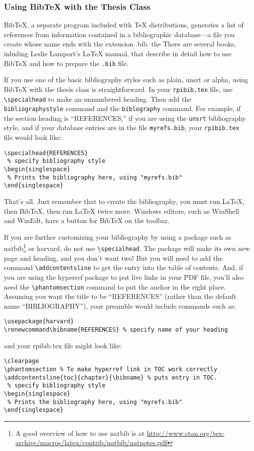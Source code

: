 \documentclass[letterpaper,11pt]{article}
\begin{document}
\subsubsection{Using Bib{\TeX} with the Thesis Class}

Bib{\TeX}, a separate program included with {\TeX} distributions, generates a list of references
from information contained in a bibliographic database—a file you create whose name ends
with the extension .bib. the There are several books, inluding Leslie Lamport's {\LaTeX} manual,
that describe in detail how to use Bib{\TeX} and how to prepare the
\verb|.bib| file.

If you use one of the basic bibliography styles such as plain, unsrt or alpha, using Bib{\TeX}
with the thesis class is straightforward. In your \verb|rpibib.tex| file, use \verb|\specialhead| to make
an unnumbered heading. Then add the \verb|bibliographystyle| command and the \verb|biblography|
command. For example, if the section heading is ``REFERENCES,'' if you are using the \verb|unsrt|
bibliography style, and if your database entries are in the file \verb|myrefs.bib|, your \verb|rpibib.tex|
file would look like:
\begin{verbatim}
\specialhead{REFERENCES}
 % specify bibliography style
\begin{singlespace}
 % Prints the bibliography here, using "myrefs.bib"
\end{singlespace}
\end{verbatim}
That's all. Just remember that to create the bibliography, you must run {\LaTeX}, then Bib{\TeX},
then run {\LaTeX} twice more. Windows editors, such as WinShell and WinEdt, have a button
for Bib{\TeX} on the toolbar.

If you are further customizing your bibliography by using a package
such as natbib\footnote{A good overview of how to use natbib is at
  \url{http://www.ctan.org/tex-archive/macros/latex/contrib/natbib/natnotes.pdf}}
or harvard, do not use \verb|\specialhead|. The package will make its own new
page and heading, and you don't want two! But you will need to add the
command \verb|\addcontentsline| to get the entry into the table of
contents. And, if you are using the hyperref package to put live links
in your PDF file, you'll also need the \verb|\phantomsection| command
to put the anchor in the right place. Assuming you want the title to
be ``REFERENCES'' (rather than the default name ``BIBLIOGRAPHY''),
your preamble would include commands such as:
\begin{verbatim}
\usepackage{harvard}
\renewcommand\bibname{REFERENCES} % specify name of your heading
\end{verbatim}
and your rpibib.tex file might look like:
\begin{verbatim}
\clearpage
\phantomsection % To make hyperref link in TOC work correctly
\addcontentsline{toc}{chapter}{\bibname} % puts entry in TOC.
 % specify bibliography style
\begin{singlespace}
 % Prints the bibliography here, using "myrefs.bib"
\end{singlespace}
\end{verbatim}
\end{document}
